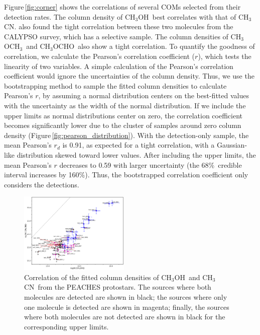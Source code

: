 \documentclass[twocolumn]{aastex62}
\newcommand{\methylformate}{\mbox{CH$_{3}$OCHO}}
\newcommand{\methanol}{\mbox{CH$_{3}$OH}}
\newcommand{\dimethylether}{\mbox{CH$_{3}$OCH$_{3}$}}
\newcommand{\methylcyanide}{\mbox{CH$_{3}$CN}}
\begin{document}
Figure\,\ref{fig:corner} shows the correlations of several COMs selected from their detection rates.  The column density of \methanol\ best correlates with that of \methylcyanide.  \citet{2020A&A...635A.198B} also found the tight correlation between these two molecules from the CALYPSO survey, which has a selective sample.  The column densities of \dimethylether\ and \methylformate\ also show a tight correlation.  To quantify the goodness of correlation, we calculate the Pearson's correlation coefficient ($r$), which tests the linearity of two variables.  A simple calculation of the Pearson's correlation coefficient would ignore the uncertainties of the column density.  Thus, we use the bootstrapping method to sample the fitted column densities to calculate Pearson's $r$, by assuming a normal distribution centers on the best-fitted values with the uncertainty as the width of the normal distribution.  If we include the upper limits as normal distributions center on zero, the correlation coefficient becomes significantly lower due to the cluster of samples around zero column density (Figure\,\ref{fig:pearson_distribution}).  With the detection-only sample, the mean Pearson's $r_{d}$ is 0.91, as expected for a tight correlation, with a Gaussian-like distribution skewed toward lower values.  After including the upper limits, the mean Pearson's $r$ decreases to 0.59 with larger uncertainty (the 68\%\ credible interval increases by 160\%).  Thus, the bootstrapped correlation coefficient only considers the detections.

\begin{figure}[htbp!]
  \centering
  \includegraphics[width=0.47\textwidth]{Ncol_ch3oh_ch3cn.pdf}
  \caption{Correlation of the fitted column densities of \methanol\ and \methylcyanide\ from the PEACHES protostars.  The sources where both molecules are detected are shown in black; the sources where only one molecule is detected are shown in magenta; finally, the sources where both molecules are not detected are shown in black for the corresponding upper limits.}
  \label{fig:ch3oh_ch3cn}
\end{figure}
\end{document}
